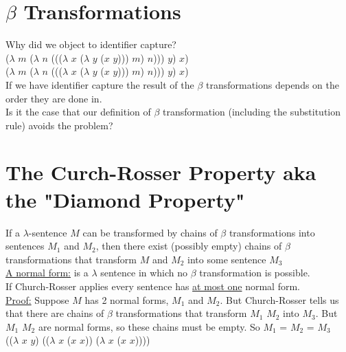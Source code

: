 \documentclass{article}
\begin{document}
 \section*{$\beta$ Transformations}
 \begin{flushleft}
  Why did we object to identifier capture?\\
  ($\lambda$ $\mathit{m}$ ($\lambda$ $\mathit{n}$ ((($\lambda$ $\mathit{x}$ ($\lambda$ $\mathit{y}$ ($\mathit{x}$ $\mathit{y}$))) $\mathit{m}$) $\mathit{n}$))) $\mathit{y}$) $\mathit{x}$) \\
  ($\lambda$ $\mathit{m}$ ($\lambda$ $\mathit{n}$ ((($\lambda$ $\mathit{x}$ ($\lambda$ $\mathit{y}$ ($\mathit{x}$ $\mathit{y}$))) $\mathit{m}$) $\mathit{n}$))) $\mathit{y}$) $\mathit{x}$) \\
  If we have identifier capture the result of the $\beta$ transformations depends on the order they are done in.\\
  \bigskip
  Is it the case that our definition of $\beta$ transformation (including the substitution rule) avoids the problem?\\
  \bigskip
  \section*{The Curch-Rosser Property aka the "Diamond Property"}
  If a $\lambda$-sentence $\mathit{M}$ can be transformed by chains of $\beta$ transformations into sentences $\mathit{M_1}$ and $\mathit{M_2}$, then there exist (possibly empty) chains of $\beta$ transformations that transform $\mathit{M}$ and $\mathit{M_2}$ into some sentence $\mathit{M_3}$\\
  \bigskip
  \underline{A normal form:} is a $\lambda$ sentence in which no $\beta$ transformation is possible.\\
  If Church-Rosser applies every sentence has \underline{at most one} normal form. \\
  \underline{Proof:} Suppose $\mathit{M}$ has 2 normal forms, $\mathit{M_1}$ and $\mathit{M_2}$. But Church-Rosser tells us that there are chains of $\beta$ transformations that transform $\mathit{M_1}$ $\mathit{M_2}$ into $\mathit{M_3}$. But $\mathit{M_1}$ $\mathit{M_2}$ are normal forms, so these chains must be empty. So $\mathit{M_1}$ =  $\mathit{M_2}$ = $\mathit{M_3}$\\
  \bigskip
  (($\lambda$ $\mathit{x}$ $\mathit{y}$) (($\lambda$ $\mathit{x}$ ($\mathit{x}$ $\mathit{x}$)) ($\lambda$ $\mathit{x}$ ($\mathit{x}$ $\mathit{x}$))))\\
 \end{flushleft}
\end{document}

